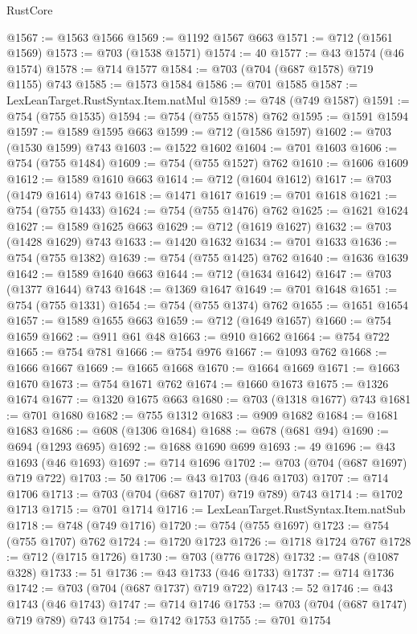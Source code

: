 \begin{lexlean}{RustCore}
\begin{coremodule}
@1567 := @1563 @1566
@1569 := @1192 @1567 @663
@1571 := @712 (@1561 @1569)
@1573 := @703 (@1538 @1571)
@1574 := 40
@1577 := @43 @1574 (@46 @1574)
@1578 := @714 @1577
@1584 := @703 (@704 (@687 @1578) @719 @1155) @743
@1585 := @1573 @1584
@1586 := @701 @1585
@1587 := LexLeanTarget.RustSyntax.Item.natMul
@1589 := @748 (@749 @1587)
@1591 := @754 (@755 @1535)
@1594 := @754 (@755 @1578) @762
@1595 := @1591 @1594
@1597 := @1589 @1595 @663
@1599 := @712 (@1586 @1597)
@1602 := @703 (@1530 @1599) @743
@1603 := @1522 @1602
@1604 := @701 @1603
@1606 := @754 (@755 @1484)
@1609 := @754 (@755 @1527) @762
@1610 := @1606 @1609
@1612 := @1589 @1610 @663
@1614 := @712 (@1604 @1612)
@1617 := @703 (@1479 @1614) @743
@1618 := @1471 @1617
@1619 := @701 @1618
@1621 := @754 (@755 @1433)
@1624 := @754 (@755 @1476) @762
@1625 := @1621 @1624
@1627 := @1589 @1625 @663
@1629 := @712 (@1619 @1627)
@1632 := @703 (@1428 @1629) @743
@1633 := @1420 @1632
@1634 := @701 @1633
@1636 := @754 (@755 @1382)
@1639 := @754 (@755 @1425) @762
@1640 := @1636 @1639
@1642 := @1589 @1640 @663
@1644 := @712 (@1634 @1642)
@1647 := @703 (@1377 @1644) @743
@1648 := @1369 @1647
@1649 := @701 @1648
@1651 := @754 (@755 @1331)
@1654 := @754 (@755 @1374) @762
@1655 := @1651 @1654
@1657 := @1589 @1655 @663
@1659 := @712 (@1649 @1657)
@1660 := @754 @1659
@1662 := @911 @61 @48
@1663 := @910 @1662
@1664 := @754 @722
@1665 := @754 @781
@1666 := @754 @976
@1667 := @1093 @762
@1668 := @1666 @1667
@1669 := @1665 @1668
@1670 := @1664 @1669
@1671 := @1663 @1670
@1673 := @754 @1671 @762
@1674 := @1660 @1673
@1675 := @1326 @1674
@1677 := @1320 @1675 @663
@1680 := @703 (@1318 @1677) @743
@1681 := @701 @1680
@1682 := @755 @1312
@1683 := @909 @1682
@1684 := @1681 @1683
@1686 := @608 (@1306 @1684)
@1688 := @678 (@681 @94)
@1690 := @694 (@1293 @695)
@1692 := @1688 @1690 @699
@1693 := 49
@1696 := @43 @1693 (@46 @1693)
@1697 := @714 @1696
@1702 := @703 (@704 (@687 @1697) @719 @722)
@1703 := 50
@1706 := @43 @1703 (@46 @1703)
@1707 := @714 @1706
@1713 := @703 (@704 (@687 @1707) @719 @789) @743
@1714 := @1702 @1713
@1715 := @701 @1714
@1716 := LexLeanTarget.RustSyntax.Item.natSub
@1718 := @748 (@749 @1716)
@1720 := @754 (@755 @1697)
@1723 := @754 (@755 @1707) @762
@1724 := @1720 @1723
@1726 := @1718 @1724 @767
@1728 := @712 (@1715 @1726)
@1730 := @703 (@776 @1728)
@1732 := @748 (@1087 @328)
@1733 := 51
@1736 := @43 @1733 (@46 @1733)
@1737 := @714 @1736
@1742 := @703 (@704 (@687 @1737) @719 @722)
@1743 := 52
@1746 := @43 @1743 (@46 @1743)
@1747 := @714 @1746
@1753 := @703 (@704 (@687 @1747) @719 @789) @743
@1754 := @1742 @1753
@1755 := @701 @1754

\end{coremodule}
\end{lexlean}
